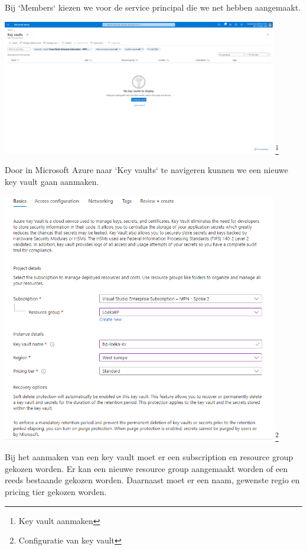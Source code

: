 Bij `Members` kiezen we voor de service principal die we net hebben aangemaakt.

\begin{center}
    \includegraphics[width=0.9\textwidth]{./graphics/databricks/connection_7.png}
    \footnote{Key vault aanmaken}
\end{center}

Door in Microsoft Azure naar `Key vaults` te navigeren kunnen we een nieuwe key vault gaan aanmaken.

\begin{center}
    \includegraphics[width=0.9\textwidth]{./graphics/databricks/connection_8.png}
    \footnote{Configuratie van key vault}
\end{center}

Bij het aanmaken van een key vault moet er een subscription en resource group gekozen worden. Er kan een nieuwe resource group aangemaakt worden of een reeds bestaande gekozen worden. Daarnaast moet er een naam, gewenste regio en pricing tier gekozen worden.

